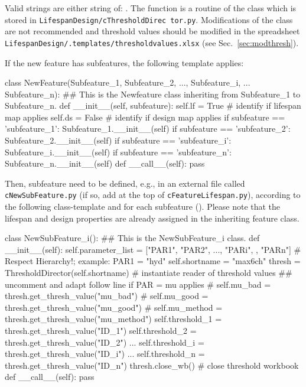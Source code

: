 Valid  strings are either string of: . The  function is a routine of the  class which is stored in \texttt{LifespanDesign/cThresholdDirec tor.py}. Modifications of the  class are not recommended and threshold values should be modified in the spreadsheet \texttt{LifespanDesign/.templates/threshold{\myUnderscore}values.xlsx} (see Sec.~\ref{sec:modthresh}).


\clearpage
If the new feature has subfeatures, the following template applies:
\begin{python}
class NewFeature(Subfeature_1, Subfeature_2, ..., Subfeature_i, ... Subfeature_n):
  ## This is the Newfeature class inheriting from Subfeature_1 to Subfeature_n.
  def __init__(self, subfeature):
      self.lf = True  # identify if lifespan map applies
      self.ds = False # identify if design map applies
      if subfeature == 'subfeature_1':
          Subfeature_1.__init__(self)
      if subfeature == 'subfeature_2':
          Subfeature_2.__init__(self)
      if subfeature == 'subfeature_i':
          Subfeature_i.__init__(self)
      if subfeature == 'subfeature_n':
          Subfeature_n.__init__(self)
  def __call__(self):
      pass
\end{python}

Then, subfeature need to be defined, e.g., in an external file called \texttt{cNewSubFeature.py} (if so, add  at the top of \texttt{cFeatureLifespan.py}), according to the following class-template and for each subfeature (). Please note that the lifespan  and design  properties are already assigned in the inheriting feature class.
\begin{python}
class NewSubFeature_i():
  ## This is the NewSubFeature_i class.
  def __init__(self):
      self.parameter_list = ["PAR1", "PAR2", ..., "PARi", , "PARn"] # Respect Hierarchy!; example: PAR1 = "hyd"
      self.shortname = "max6ch"
      thresh = ThresholdDirector(self.shortname) # instantiate reader of threshold values
      ## uncomment and adapt follow line if PAR = mu applies
      # self.mu_bad = thresh.get_thresh_value("mu_bad") 
      # self.mu_good = thresh.get_thresh_value("mu_good") 
      # self.mu_method = thresh.get_thresh_value("mu_method")
      self.threshold_1 = thresh.get_thresh_value("ID_1")
      self.threshold_2 = thresh.get_thresh_value("ID_2")
      ...
      self.threshold_i = thresh.get_thresh_value("ID_i")
      ...
      self.threshold_n = thresh.get_thresh_value("ID_n")
      thresh.close_wb() # close threshold workbook
  def __call__(self):
      pass
\end{python}
